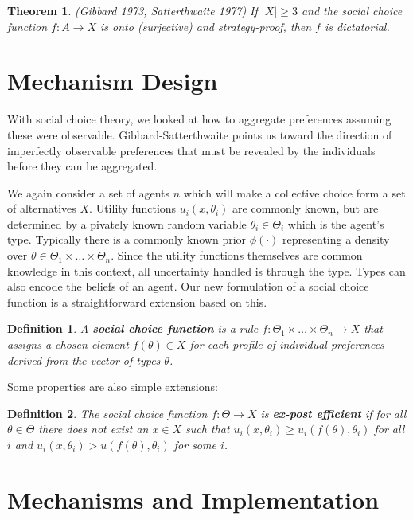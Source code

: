 \documentclass[letter, 10pt]{article}
\theoremstyle{basic}
\newtheorem{definition}{Definition}[section]
\newtheorem{theorem}{Theorem}[section]
\begin{document}
\begin{spacing}{1.0}
\begin{theorem}
  (Gibbard 1973, Satterthwaite 1977) If  $|X| \geq 3$ and
  the social choice function $f: A \to X$ is onto (surjective) and
  strategy-proof, then $f$ is dictatorial.
\end{theorem}

\section{Mechanism Design}

With social choice theory, we looked at how to aggregate preferences
assuming these were observable. Gibbard-Satterthwaite points us toward the
direction of imperfectly observable preferences that must be revealed by
the individuals before they can be aggregated.

\hspace{1em}
We again consider a set of agents $n$ which will make a collective choice
form a set of alternatives $X$. Utility functions $u_i(x, \theta_i)$ are
commonly known, but are determined by a pivately known random variable
$\theta_i \in \Theta_i$ which is the agent's type. Typically there is a
commonly known prior $\phi(\cdot)$ representing a density over $\theta \in
\Theta_1 \times \ldots \times \Theta_n$. Since the utility functions
themselves are common knowledge in this context, all uncertainty handled is
through the type. Types can also encode the beliefs of an agent. Our new
formulation of a social choice function is a straightforward extension
based on this.

\begin{definition}
  A \textbf{social choice function} is a rule $f:
  \Theta_1 \times \ldots \times \Theta_n \to X$ that
  assigns a chosen element $f(\theta) \in X$ for each
  profile of individual preferences derived from the
  vector of types $\theta$.
\end{definition}

Some properties are also simple extensions:

\begin{definition}
  The social choice function $f: \Theta \to X$ is
  \textbf{ex-post efficient} if for all $\theta \in
  \Theta$ there does not exist an $x \in X$ such that
  $u_i(x, \theta_i) \geq u_i(f(\theta), \theta_i)$ for
  all $i$ and $u_i(x, \theta_i) > u(f(\theta), \theta_i)$
  for some $i$.
\end{definition}

\section{Mechanisms and Implementation}


\end{spacing}
\end{document}
